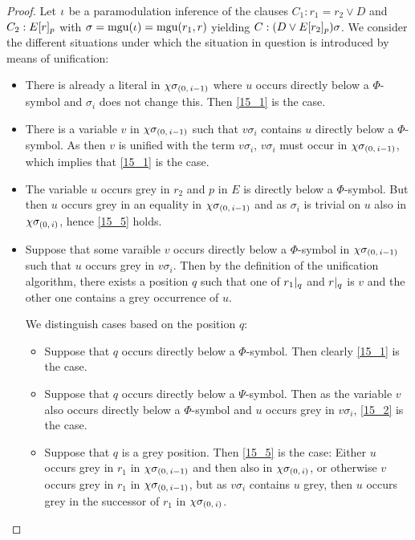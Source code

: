 \documentclass[,%
	draft=false,%
	numbers=noendperiod
	12pt,
	a4paper,
	oneside,%
	openany,
]{memoir}
\newcommand{\inv}{\ensuremath{\chi}}
\begin{document}
\begin{proof}
	Let  $\iota$ be a paramodulation inference  of the clauses $C_1: r_1=r_2 \lor D$ and $C_2: E{[r]_{p}}$ with $\sigma=\operatorname{mgu}(\iota)=\operatorname{mgu}(r_1, r)$ yielding $C: (D\lor E{[r_2]_{p}})\sigma$.
	We consider the different situations under which the situation in question is introduced by means of unification: 

	\begin{itemize}
		\item
			There is already a literal in $\inv\sigmazmi$ where $u$ occurs directly below a $\Phi$-symbol and $\sigma_i$ does not change this.
			Then \ref{15_1} is the case.

		\item
			There is a variable $v$ in $\inv\sigmazmi$ such that $v\sigma_i$ contains $u$ directly below a $\Phi$-symbol.
			As then $v$ is unified with the term $v\sigma_i$, $v\sigma_i$ must occur in $\inv\sigmazmi$, which implies that \ref{15_1} is the case.

		\item
			The variable $u$ occurs grey in $r_2$ and $p$ in $E$ is directly below a $\Phi$-symbol. 
			But then $u$ occurs grey in an equality in $\inv\sigmazmi$ and as $\sigma_i$ is trivial on $u$ also in $\inv\sigmazi$, hence \ref{15_5} holds.

		\item
			Suppose that some varaible $v$ occurs directly below a $\Phi$-symbol in $\inv\sigmazmi$ such that $u$ occurs grey in $v\sigma_i$.
			Then by the definition of the unification algorithm, there exists a position $q$ such that one of $r_1|_{q}$ and $r|_{q}$ is $v$ and the other one contains a grey occurrence of $u$.

			We distinguish cases based on the position $q$:

			\begin{itemize}
				\item
					Suppose that $q$ occurs directly below a $\Phi$-symbol. Then clearly \ref{15_1} is the case.

				\item
					Suppose that $q$ occurs directly below a $\Psi$-symbol. Then as the variable $v$ also occurs directly below a $\Phi$-symbol and $u$ occurs grey in $v\sigma_i$, \ref{15_2} is the case.

				\item
					Suppose that $q$ is a grey position.
					Then \ref{15_5} is the case: 
					Either $u$ occurs grey in $r_1$ in $\inv\sigmazmi$ and then also in $\inv\sigmazi$, 
					or otherwise $v$ occurs grey in $r_1$ in $\inv\sigmazmi$, but as $v\sigma_i$ contains $u$ grey, then $u$ occurs grey in the successor of $r_1$ in $\inv\sigmazi$.
					\qedhere
			\end{itemize}

	\end{itemize}

\end{proof}
\end{document}
